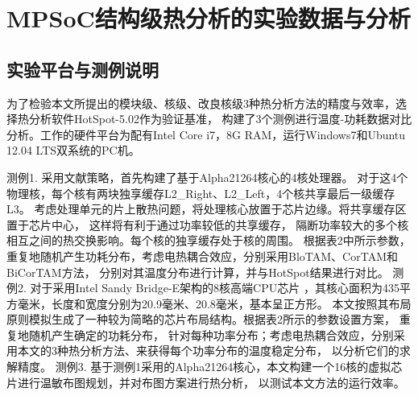 

\chapter{MPSoC结构级热分析的实验数据与分析}
\label{cha:SSTAexperiments}

\section{实验平台与测例说明}
为了检验本文所提出的模块级、核级、改良核级3种热分析方法的精度与效率，选择热分析软件HotSpot-5.02作为验证基准， 构建了3个测例进行温度-功耗数据对比分析。工作的硬件平台为配有Intel Core i7，8G RAM，运行Windows7和Ubuntu 12.04 LTS双系统的PC机。

测例1. 采用文献策略，首先构建了基于Alpha21264核心的4核处理器。 对于这4个物理核，每个核有两块独享缓存L2\_Right、L2\_Left，4个核共享最后一级缓存L3。 考虑处理单元的片上散热问题，将处理核心放置于芯片边缘。将共享缓存区置于芯片中心， 这样将有利于通过功率较低的共享缓存， 隔断功率较大的多个核相互之间的热交换影响。每个核的独享缓存处于核的周围。 根据表2中所示参数，重复地随机产生功耗分布，考虑电热耦合效应，分别采用BloTAM、CorTAM和BiCorTAM方法， 分别对其温度分布进行计算，并与HotSpot结果进行对比。
测例2. 对于采用Intel Sandy Bridge-E架构的8核高端CPU芯片 ，其核心面积为435平方毫米，长度和宽度分别为20.9毫米、20.8毫米，基本呈正方形。 本文按照其布局原则模拟生成了一种较为简略的芯片布局结构。根据表2所示的参数设置方案， 重复地随机产生确定的功耗分布， 针对每种功率分布；考虑电热耦合效应，分别采用本文的3种热分析方法、来获得每个功率分布的温度稳定分布， 以分析它们的求解精度。
测例3. 基于测例1采用的Alpha21264核心，本文构建一个16核的虚拟芯片进行温敏布图规划，并对布图方案进行热分析， 以测试本文方法的运行效率。

